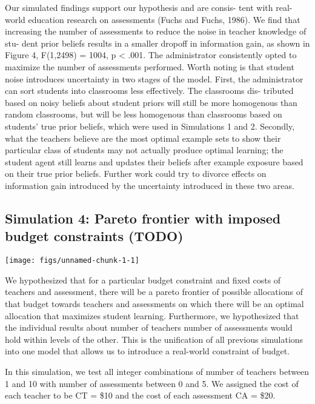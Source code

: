 \documentclass[10pt, letterpaper]{article}
\newenvironment{CodeChunk}{}{}
\begin{document}
Our simulated findings support our hypothesis and are consis- tent with
real-world education research on assessments (Fuchs and Fuchs, 1986). We
find that increasing the number of assessments to reduce the noise in
teacher knowledge of stu- dent prior beliefs results in a smaller
dropoff in information gain, as shown in Figure 4, F(1,2498) = 1004, p
\textless{} .001. The administrator consistently opted to maximize the
number of assessments performed. Worth noting is that student noise
introduces uncertainty in two stages of the model. First, the
administrator can sort students into classrooms less effectively. The
classrooms dis- tributed based on noisy beliefs about student priors
will still be more homogenous than random classrooms, but will be less
homogenous than classrooms based on students' true prior beliefs, which
were used in Simulations 1 and 2. Secondly, what the teachers believe
are the most optimal example sets to show their particular class of
students may not actually produce optimal learning; the student agent
still learns and updates their beliefs after example exposure based on
their true prior beliefs. Further work could try to divorce effects on
information gain introduced by the uncertainty introduced in these two
areas.

\subsection{Simulation 4: Pareto frontier with imposed budget
constraints
(TODO)}\label{simulation-4-pareto-frontier-with-imposed-budget-constraints-todo}

\begin{CodeChunk}

\texttt{[image: figs/unnamed-chunk-1-1]} \end{CodeChunk}

We hypothesized that for a particular budget constraint and fixed costs
of teachers and assessment, there will be a pareto frontier of possible
allocations of that budget towards teachers and assessments on which
there will be an optimal allocation that maximizes student learning.
Furthermore, we hypothesized that the individual results about number of
teachers number of assessments would hold within levels of the other.
This is the unification of all previous simulations into one model that
allows us to introduce a real-world constraint of budget.

In this simulation, we test all integer combinations of number of
teachers between 1 and 10 with number of assessments between 0 and 5. We
assigned the cost of each teacher to be CT = \$10 and the cost of each
assessment CA = \$20.
\end{document}
